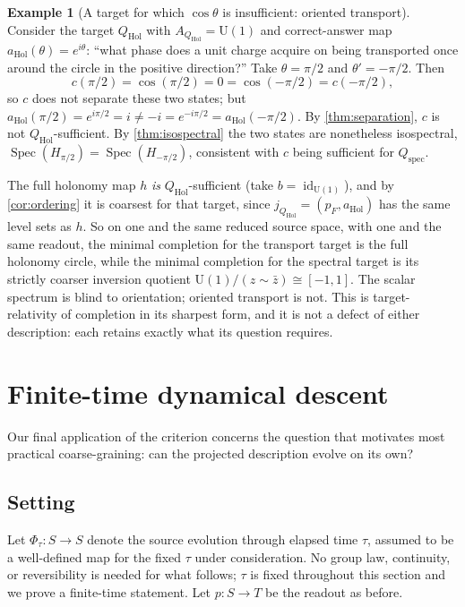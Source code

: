 \documentclass[11pt,reqno]{amsart}
\theoremstyle{plain}
\theoremstyle{definition}
\newtheorem{example}[theorem]{Example}
\newcommand{\Uone}{\mathrm{U}(1)}
\newcommand{\Src}{S}
\newcommand{\Rdt}{T}
\newcommand{\Spec}{\operatorname{Spec}}
\newcommand{\id}{\operatorname{id}}
\DeclareMathOperator{\Hol}{Hol}
\begin{document}
\begin{example}[A target for which $\cos\theta$ is insufficient: oriented
transport]\label{ex:transport}
Consider the target $Q_{\Hol}$ with $A_{Q_{\Hol}}=\Uone$ and correct-answer map
$a_{\Hol}(\theta)=e^{i\theta}$: ``what phase does a unit charge acquire on being transported once
around the circle in the positive direction?'' Take $\theta=\pi/2$ and $\theta'=-\pi/2$. Then
\begin{equation*}
c(\pi/2)=\cos(\pi/2)=0=\cos(-\pi/2)=c(-\pi/2),
\end{equation*}
so $c$ does not separate these two states; but
$a_{\Hol}(\pi/2)=e^{i\pi/2}=i\neq -i=e^{-i\pi/2}=a_{\Hol}(-\pi/2)$. By \cref{thm:separation}, $c$
is not $Q_{\Hol}$-sufficient. By \cref{thm:isospectral} the two states are nonetheless
isospectral, $\Spec(H_{\pi/2})=\Spec(H_{-\pi/2})$, consistent with $c$ being sufficient for
$Q_{\mathrm{spec}}$.

The full holonomy map $h$ \emph{is} $Q_{\Hol}$-sufficient (take $b=\id_{\Uone}$), and by
\cref{cor:ordering} it is coarsest for that target, since $j_{Q_{\Hol}}=(p_F,a_{\Hol})$ has the
same level sets as $h$. So on one and the same reduced source space, with one and the same
readout, the minimal completion for the transport target is the full holonomy circle, while the
minimal completion for the spectral target is its strictly coarser inversion quotient
$\Uone/(z\sim\bar z)\cong[-1,1]$. The scalar spectrum is blind to orientation; oriented transport
is not. This is target-relativity of completion in its sharpest form, and it is not a defect of
either description: each retains exactly what its question requires.
\end{example}

\section{Finite-time dynamical descent}\label{sec:dynamics}

Our final application of the criterion concerns the question that motivates most practical
coarse-graining: can the projected description evolve on its own?

\subsection{Setting}

Let $\Phi_\tau\colon\Src\to\Src$ denote the source evolution through elapsed time $\tau$, assumed
to be a well-defined map for the fixed $\tau$ under consideration. No group law, continuity, or
reversibility is needed for what follows; $\tau$ is fixed throughout this section and we prove a
finite-time statement. Let $p\colon\Src\to\Rdt$ be the readout as before.
\end{document}

